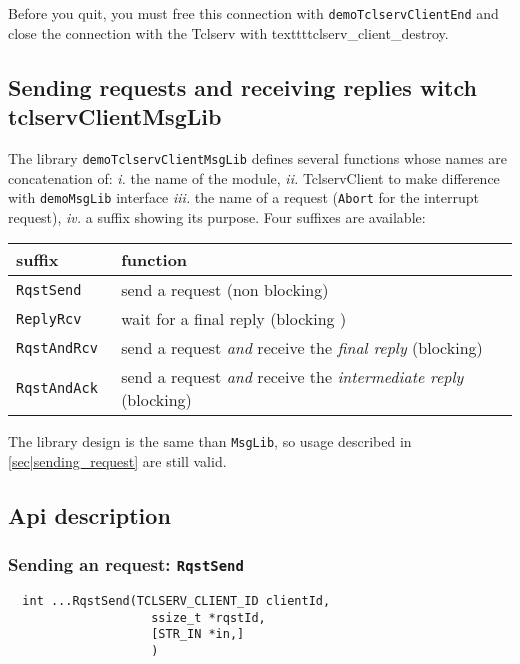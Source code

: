 Before you  quit, you must  free this connection with \texttt{demoTclservClientEnd}
and close the connection with the Tclserv with texttt{tclserv\_client\_destroy}.


\subsection{Sending requests and receiving replies witch tclservClientMsgLib}

The library \texttt{demoTclservClientMsgLib}  defines  several functions whose
names are concatenation of: \emph{i.} the name of the module, \emph{ii.}
TclservClient to make difference with \texttt{demoMsgLib} interface \emph{iii.}
the name of a request (\texttt{Abort} for the interrupt request),  \emph{iv.}
a  suffix showing its purpose. Four suffixes are available:

\begin{center}\small\begin{tabularx}{\linewidth}{|l|X|}
\hline
suffix & function \\
\hline
\tt RqstSend & send a request (non blocking) \\

\tt ReplyRcv & wait for a final reply (blocking )\\

\tt RqstAndRcv & send a request \emph{and} receive the \emph{final reply}
(blocking) \\

\tt RqstAndAck & send a request \emph{and} receive the \emph{intermediate reply}
(blocking) \\
\hline
\end{tabularx}\end{center}

The library design is the same than \texttt{MsgLib}, so usage described in
\ref{sec|sending_request} are still valid.

\subsection{Api description}

\subsubsection{Sending an request: \texttt{RqstSend}}

\begin{center}\begin{cartouche}\small\begin{verbatim}
  int ...RqstSend(TCLSERV_CLIENT_ID clientId,
                    ssize_t *rqstId, 
                    [STR_IN *in,]
					)
\end{verbatim}\end{cartouche}\end{center}



